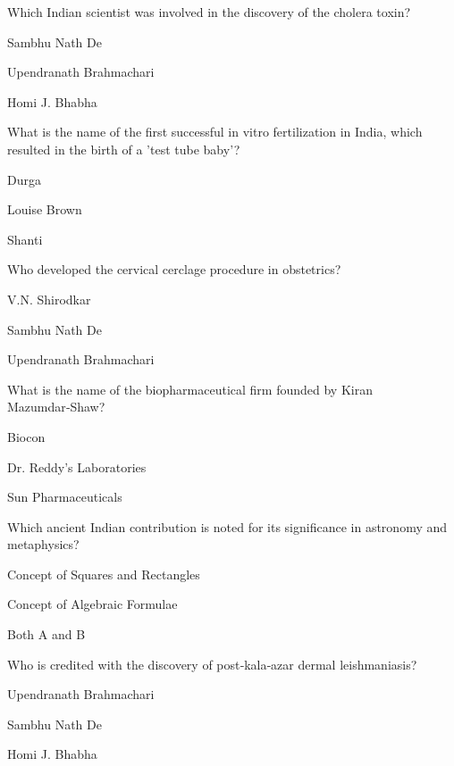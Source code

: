 \begin{enhancedmcq}{Which Indian scientist was involved in the discovery of the cholera toxin?}
\item Sambhu Nath De
\item Upendranath Brahmachari
\item Homi J. Bhabha

\end{enhancedmcq}
\begin{enhancedmcq}{What is the name of the first successful in vitro fertilization in India, which resulted in the birth of a 'test tube baby'?}
\item Durga
\item Louise Brown
\item Shanti

\end{enhancedmcq}
\begin{enhancedmcq}{Who developed the cervical cerclage procedure in obstetrics?}
\item V.N. Shirodkar
\item Sambhu Nath De
\item Upendranath Brahmachari

\end{enhancedmcq}
\begin{enhancedmcq}{What is the name of the biopharmaceutical firm founded by Kiran Mazumdar‑Shaw?}
\item Biocon
\item Dr. Reddy's Laboratories
\item Sun Pharmaceuticals

\end{enhancedmcq}
\begin{enhancedmcq}{Which ancient Indian contribution is noted for its significance in astronomy and metaphysics?}
\item Concept of Squares and Rectangles
\item Concept of Algebraic Formulae
\item Both A and B

\end{enhancedmcq}
\begin{enhancedmcq}{Who is credited with the discovery of post‑kala‑azar dermal leishmaniasis?}
\item Upendranath Brahmachari
\item Sambhu Nath De
\item Homi J. Bhabha

\end{enhancedmcq}
